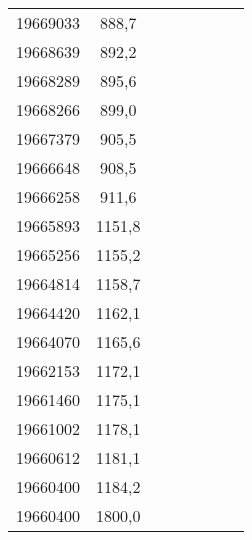 \documentclass[11pt]{article}
\begin{document}
{{\begin{tabular}{|c|c|cc|c|c|cc}
            \cline{1-2} 
            19669033 & 888,7 &  & \multicolumn{1}{c}{} & \multicolumn{1}{c}{} & \multicolumn{1}{c}{} &  & \tabularnewline
            \cline{1-2} 
            19668639 & 892,2 &  & \multicolumn{1}{c}{} & \multicolumn{1}{c}{} & \multicolumn{1}{c}{} &  & \tabularnewline
            \cline{1-2} 
            19668289 & 895,6 &  & \multicolumn{1}{c}{} & \multicolumn{1}{c}{} & \multicolumn{1}{c}{} &  & \tabularnewline
            \cline{1-2} 
            19668266 & 899,0 &  & \multicolumn{1}{c}{} & \multicolumn{1}{c}{} & \multicolumn{1}{c}{} &  & \tabularnewline
            \cline{1-2} 
            19667379 & 905,5 &  & \multicolumn{1}{c}{} & \multicolumn{1}{c}{} & \multicolumn{1}{c}{} &  & \tabularnewline
            \cline{1-2} 
            19666648 & 908,5 &  & \multicolumn{1}{c}{} & \multicolumn{1}{c}{} & \multicolumn{1}{c}{} &  & \tabularnewline
            \cline{1-2} 
            19666258 & 911,6 &  & \multicolumn{1}{c}{} & \multicolumn{1}{c}{} & \multicolumn{1}{c}{} &  & \tabularnewline
            \cline{1-2} 
            19665893 & 1151,8 &  & \multicolumn{1}{c}{} & \multicolumn{1}{c}{} & \multicolumn{1}{c}{} &  & \tabularnewline
            \cline{1-2} 
            19665256 & 1155,2 &  & \multicolumn{1}{c}{} & \multicolumn{1}{c}{} & \multicolumn{1}{c}{} &  & \tabularnewline
            \cline{1-2} 
            19664814 & 1158,7 &  & \multicolumn{1}{c}{} & \multicolumn{1}{c}{} & \multicolumn{1}{c}{} &  & \tabularnewline
            \cline{1-2} 
            19664420 & 1162,1 &  & \multicolumn{1}{c}{} & \multicolumn{1}{c}{} & \multicolumn{1}{c}{} &  & \tabularnewline
            \cline{1-2} 
            19664070 & 1165,6 &  & \multicolumn{1}{c}{} & \multicolumn{1}{c}{} & \multicolumn{1}{c}{} &  & \tabularnewline
            \cline{1-2} 
            19662153 & 1172,1 &  & \multicolumn{1}{c}{} & \multicolumn{1}{c}{} & \multicolumn{1}{c}{} &  & \tabularnewline
            \cline{1-2} 
            19661460 & 1175,1 &  & \multicolumn{1}{c}{} & \multicolumn{1}{c}{} & \multicolumn{1}{c}{} &  & \tabularnewline
            \cline{1-2} 
            19661002 & 1178,1 &  & \multicolumn{1}{c}{} & \multicolumn{1}{c}{} & \multicolumn{1}{c}{} &  & \tabularnewline
            \cline{1-2} 
            19660612 & 1181,1 &  & \multicolumn{1}{c}{} & \multicolumn{1}{c}{} & \multicolumn{1}{c}{} &  & \tabularnewline
            \cline{1-2} 
            19660400 & 1184,2 &  & \multicolumn{1}{c}{} & \multicolumn{1}{c}{} & \multicolumn{1}{c}{} &  & \tabularnewline
            \cline{1-2} 
            19660400 & 1800,0 &  & \multicolumn{1}{c}{} & \multicolumn{1}{c}{} & \multicolumn{1}{c}{} &  & \tabularnewline
            \cline{1-2} 
        \end{tabular}
    }
}
\vspace*{\fill}
\end{document}
